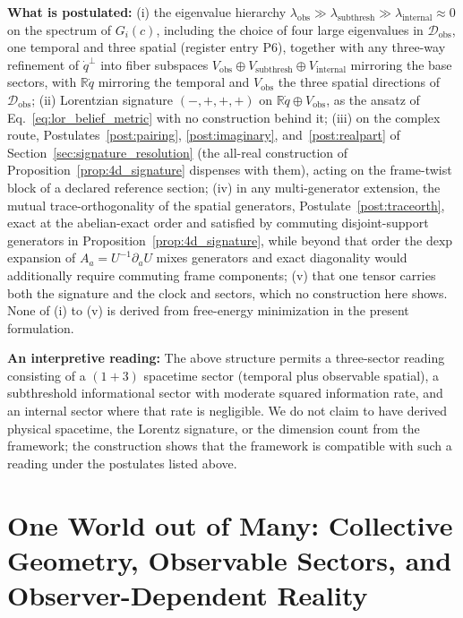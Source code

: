 \documentclass[11pt]{article}
\begin{document}
\begin{center}
{\begin{minipage}{0.9\columnwidth}
\textbf{What is postulated:} (i) the eigenvalue hierarchy $\lambda_{\text{obs}} \gg \lambda_{\text{subthresh}} \gg \lambda_{\text{internal}} \approx 0$ on the spectrum of $G_i(c)$, including the choice of four large eigenvalues in $\mathcal{D}_{\text{obs}}$, one temporal and three spatial (register entry P6), together with any three-way refinement of $\dot{q}^\perp$ into fiber subspaces $V_{\text{obs}} \oplus V_{\text{subthresh}} \oplus V_{\text{internal}}$ mirroring the base sectors, with $\mathbb{R}\dot{q}$ mirroring the temporal and $V_{\text{obs}}$ the three spatial directions of $\mathcal{D}_{\text{obs}}$; (ii) Lorentzian signature $(-,+,+,+)$ on $\mathbb{R}\dot{q} \oplus V_{\text{obs}}$, as the ansatz of Eq.~\eqref{eq:lor_belief_metric} with no construction behind it; (iii) on the complex route, Postulates~\ref{post:pairing}, \ref{post:imaginary}, and~\ref{post:realpart} of Section~\ref{sec:signature_resolution} (the all-real construction of Proposition~\ref{prop:4d_signature} dispenses with them), acting on the frame-twist block of a declared reference section; (iv) in any multi-generator extension, the mutual trace-orthogonality of the spatial generators, Postulate~\ref{post:traceorth}, exact at the abelian-exact order and satisfied by commuting disjoint-support generators in Proposition~\ref{prop:4d_signature}, while beyond that order the $\mathrm{dexp}$ expansion of $A_a = U^{-1}\partial_a U$ mixes generators and exact diagonality would additionally require commuting frame components; (v) that one tensor carries both the signature and the clock and sectors, which no construction here shows. None of (i) to (v) is derived from free-energy minimization in the present formulation.

\textbf{An interpretive reading:} The above structure permits a three-sector reading consisting of a $(1+3)$ spacetime sector (temporal plus observable spatial), a subthreshold informational sector with moderate squared information rate, and an internal sector where that rate is negligible. We do not claim to have derived physical spacetime, the Lorentz signature, or the dimension count from the framework; the construction shows that the framework is compatible with such a reading under the postulates listed above.
\end{minipage}}
\end{center}
\section{One World out of Many: Collective Geometry, Observable Sectors, and Observer-Dependent Reality}\label{sec:collective_geometry}
\end{document}
